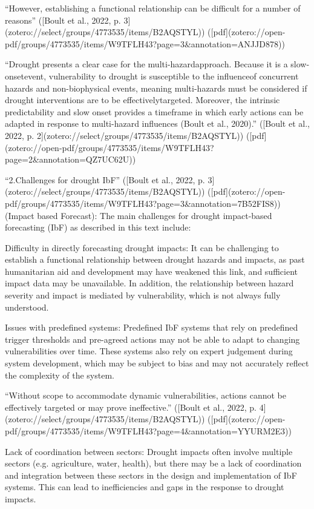 {“However, establishing a functional relationship can be difficult for a number of reasons” ([Boult et al., 2022, p. 3](zotero://select/groups/4773535/items/B2AQSTYL)) ([pdf](zotero://open-pdf/groups/4773535/items/W9TFLH43?page=3&annotation=ANJJD878))

“Drought presents a clear case for the multi-hazardapproach. Because it is a slow-onsetevent, vulnerability to drought is susceptible to the influenceof concurrent hazards and non-biophysical events, meaning multi-hazards must be considered if drought interventions are to be effectivelytargeted. Moreover, the intrinsic predictability and slow onset provides a timeframe in which early actions can be adapted in response to multi-hazard influences (Boult et al., 2020).” ([Boult et al., 2022, p. 2](zotero://select/groups/4773535/items/B2AQSTYL)) ([pdf](zotero://open-pdf/groups/4773535/items/W9TFLH43?page=2&annotation=QZ7UC62U))

“2.Challenges for drought IbF” ([Boult et al., 2022, p. 3](zotero://select/groups/4773535/items/B2AQSTYL)) ([pdf](zotero://open-pdf/groups/4773535/items/W9TFLH43?page=3&annotation=7B52FIS8)) (Impact based Forecast):
The main challenges for drought impact-based forecasting (IbF) as described in this text include:

Difficulty in directly forecasting drought impacts: It can be challenging to establish a functional relationship between drought hazards and impacts, as past humanitarian aid and development may have weakened this link, and sufficient impact data may be unavailable. In addition, the relationship between hazard severity and impact is mediated by vulnerability, which is not always fully understood.

Issues with predefined systems: Predefined IbF systems that rely on predefined trigger thresholds and pre-agreed actions may not be able to adapt to changing vulnerabilities over time. These systems also rely on expert judgement during system development, which may be subject to bias and may not accurately reflect the complexity of the system.

“Without scope to accommodate dynamic vulnerabilities, actions cannot be effectively targeted or may prove ineffective.” ([Boult et al., 2022, p. 4](zotero://select/groups/4773535/items/B2AQSTYL)) ([pdf](zotero://open-pdf/groups/4773535/items/W9TFLH43?page=4&annotation=YYURM2E3))

Lack of coordination between sectors: Drought impacts often involve multiple sectors (e.g. agriculture, water, health), but there may be a lack of coordination and integration between these sectors in the design and implementation of IbF systems. This can lead to inefficiencies and gaps in the response to drought impacts.

}
